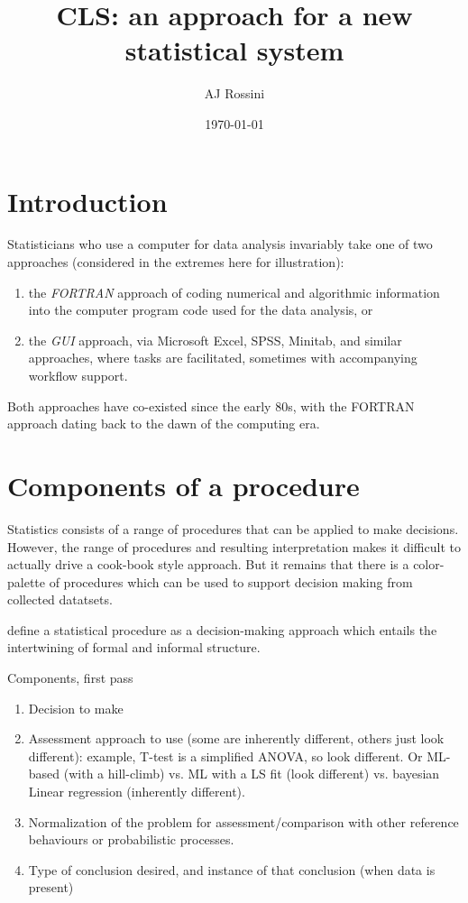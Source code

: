 \documentclass{article}
\title{CLS: an approach for a new statistical system}
\author{AJ Rossini}
\date{\today}
\begin{document}
\maketitle

\section{Introduction}
\label{sec:intro}

Statisticians who use a computer for data analysis invariably take one
of two approaches (considered in the extremes here for illustration): 
\begin{enumerate}
\item the \emph{FORTRAN} approach of coding numerical and algorithmic
  information into the computer program code used for the data
  analysis, or 
\item the \emph{GUI} approach, via Microsoft Excel, SPSS, Minitab, and
  similar approaches, where tasks are facilitated, sometimes with
  accompanying workflow support.
\end{enumerate}
Both approaches have co-existed since the early 80s, with the FORTRAN
approach dating back to the dawn of the computing era.

\section{Components of a procedure}
\label{sec:components}

Statistics consists of a range of procedures that can be applied to
make decisions.  However, the range of procedures and resulting
interpretation makes it difficult to actually drive a cook-book style
approach.  But it remains that there is a color-palette of procedures
which can be used to support decision making from collected
datatsets. 

define a statistical procedure as a decision-making approach which
entails the intertwining of formal and informal structure.   

Components, first pass
\begin{enumerate}
\item \label{statproc-decision} Decision to make
\item \label{statproc-assessment} Assessment approach to use (some are
  inherently different, others just look different): example, T-test
  is a simplified ANOVA, so look different.  Or ML-based (with a
  hill-climb) vs. ML with a LS fit (look different) vs. bayesian
  Linear regression (inherently different).
\item \label{statproc-normalization} Normalization of the problem for
  assessment/comparison with other reference behaviours or
  probabilistic processes.
\item \label{conclusion} Type of conclusion desired, and instance of
  that conclusion (when data is present)
\end{enumerate}
\end{document}
